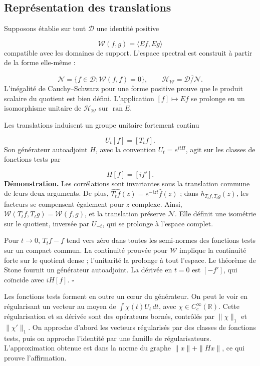 \subsection{Représentation des translations}
\label{viii:rz:traslaciones}
Supposons établie sur tout \(\mathcal D\) une identité positive

\[
\mathscr W(f,g)=\langle Ef,Eg\rangle
\]
compatible avec les domaines de support. L'espace spectral est construit à partir de la forme elle-même :

\[
\mathcal N=\{f\in\mathcal D:\mathscr W(f,f)=0\},\qquad
\mathcal H_{\mathscr W}
=\overline{\mathcal D/\mathcal N}.
\]
L’inégalité de Cauchy–Schwarz pour une forme positive prouve que le produit scalaire du quotient est bien défini. L’application \([f]\mapsto Ef\) se prolonge en un isomorphisme unitaire de \(\mathcal H_{\mathscr W}\) sur \(\overline{\operatorname{ran}E}\).

Les translations induisent un groupe unitaire fortement continu

\[
U_t[f]=[T_tf].
\]
Son générateur autoadjoint \(H\), avec la convention \(U_t=e^{itH}\), agit sur les classes de fonctions tests par

\[
H[f]=[i f'].
\]
\textbf{Démonstration.} Les corrélations sont invariantes sous la translation commune de leurs deux arguments. De plus, \(\widehat{T_tf}(z)=e^{-izt}\widehat f(z)\) ; dans \(h_{T_tf,T_tg}(z)\), les facteurs se compensent également pour \(z\) complexe. Ainsi, \(\mathscr W(T_tf,T_tg)=\mathscr W(f,g)\), et la translation préserve \(\mathcal N\). Elle définit une isométrie sur le quotient, inversée par \(U_{-t}\), qui se prolonge à l'espace complet.

Pour \(t\to0\), \(T_tf-f\) tend vers zéro dans toutes les semi-normes des fonctions tests sur un compact commun. La continuité prouvée pour \(\mathscr W\) implique la continuité forte sur le quotient dense ; l’unitarité la prolonge à tout l’espace. Le théorème de Stone fournit un générateur autoadjoint. La dérivée en \(t=0\) est \([-f']\), qui coïncide avec \(iH[f]\). \hfill\(\square\)

Les fonctions tests forment en outre un cœur du générateur. On peut le voir en régularisant un vecteur au moyen de \(\int\chi(t)U_t\,dt\), avec \(\chi\in C_c^\infty(\mathbb R)\). Cette régularisation et sa dérivée sont des opérateurs bornés, contrôlés par \(\|\chi\|_1\) et \(\|\chi'\|_1\). On approche d'abord les vecteurs régularisés par des classes de fonctions tests, puis on approche l'identité par une famille de régularisateurs. L'approximation obtenue est dans la norme du graphe \(\|x\|+\|Hx\|\), ce qui prouve l'affirmation.

